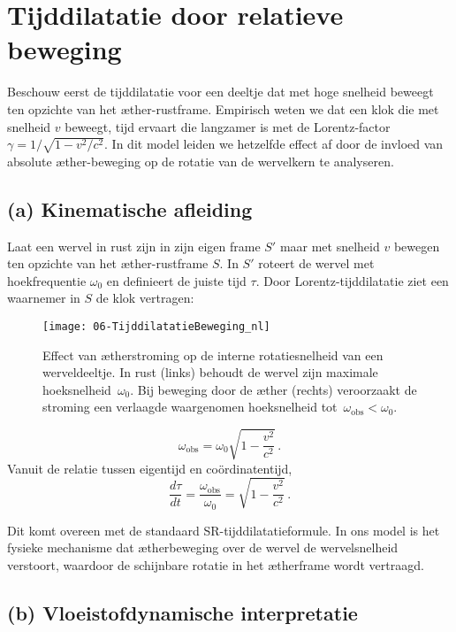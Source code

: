 \section{Tijddilatatie door relatieve beweging}

Beschouw eerst de tijddilatatie voor een deeltje dat met hoge snelheid beweegt ten opzichte van het æther-rustframe. Empirisch weten we dat een klok die met snelheid $v$ beweegt, tijd ervaart die langzamer is met de Lorentz-factor $\gamma = 1/\sqrt{1 - v^2/c^2}$. In dit model leiden we hetzelfde effect af door de invloed van absolute æther-beweging op de rotatie van de wervelkern te analyseren.

\subsection*{(a) Kinematische afleiding}

Laat een wervel in rust zijn in zijn eigen frame $S'$ maar met snelheid $v$ bewegen ten opzichte van het æther-rustframe $S$. In $S'$ roteert de wervel met hoekfrequentie $\omega_0$ en definieert de juiste tijd $\tau$. Door Lorentz-tijddilatatie ziet een waarnemer in $S$ de klok vertragen:

\begin{figure}[htbp]
    \centering
    \texttt{[image: 06-TijddilatatieBeweging\_nl]}
    \caption{Effect van ætherstroming op de interne rotatiesnelheid van een werveldeeltje. In rust (links) behoudt de wervel zijn maximale hoeksnelheid~$\omega_0$. Bij beweging door de æther (rechts) veroorzaakt de stroming een verlaagde waargenomen hoeksnelheid tot~$\omega_{\mathrm{obs}} < \omega_0$.}
    \label{fig:TijddilatatieBeweging}
\end{figure}

\[
    \omega_\text{obs} = \omega_0 \sqrt{1 - \frac{v^2}{c^2}} \,.
\]
Vanuit de relatie tussen eigentijd en coördinatentijd,
\[
    \frac{d\tau}{dt} = \frac{\omega_\text{obs}}{\omega_0} = \sqrt{1 - \frac{v^2}{c^2}} \,. \tag{2}
\]

Dit komt overeen met de standaard SR-tijddilatatieformule. In ons model is het fysieke mechanisme dat ætherbeweging over de wervel de wervelsnelheid verstoort, waardoor de schijnbare rotatie in het ætherframe wordt vertraagd.

\subsection*{(b) Vloeistofdynamische interpretatie}

